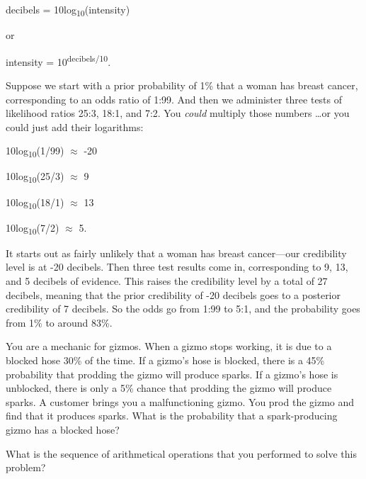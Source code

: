 {\centering
 decibels = 10log\textsubscript{10}(intensity)
\par}


\bigskip

{
 or}

{\centering
 intensity = 10\textsuperscript{decibels/10}.
\par}


\bigskip

{
 Suppose we start with a prior probability of 1\% that a woman has
breast cancer, corresponding to an odds ratio of 1:99. And then we
administer three tests of likelihood ratios 25:3, 18:1, and 7:2. You
\textit{could} multiply those numbers \ldots or you could just add their
logarithms:}

{\centering
 10log\textsubscript{10}(1/99) ${\approx}$ -20
\par}


\bigskip

{\centering
 10log\textsubscript{10}(25/3) ${\approx}$ 9
\par}


\bigskip

{\centering
 10log\textsubscript{10}(18/1) ${\approx}$ 13
\par}


\bigskip

{\centering
 10log\textsubscript{10}(7/2) ${\approx}$ 5.
\par}


\bigskip

{
 It starts out as fairly unlikely that a woman has breast
cancer---our credibility level is at -20 decibels. Then three test
results come in, corresponding to 9, 13, and 5 decibels of evidence.
This raises the credibility level by a total of 27 decibels, meaning
that the prior credibility of -20 decibels goes to a posterior
credibility of 7 decibels. So the odds go from 1:99 to 5:1, and the
probability goes from 1\% to around 83\%.}

{
 You are a mechanic for gizmos. When a gizmo stops working, it is
due to a blocked hose 30\% of the time. If a gizmo's
hose is blocked, there is a 45\% probability that prodding the gizmo
will produce sparks. If a gizmo's hose is unblocked,
there is only a 5\% chance that prodding the gizmo will produce sparks.
A customer brings you a malfunctioning gizmo. You prod the gizmo and
find that it produces sparks. What is the probability that a
spark-producing gizmo has a blocked hose?}

{
 What is the sequence of arithmetical operations that you performed
to solve this problem?}

